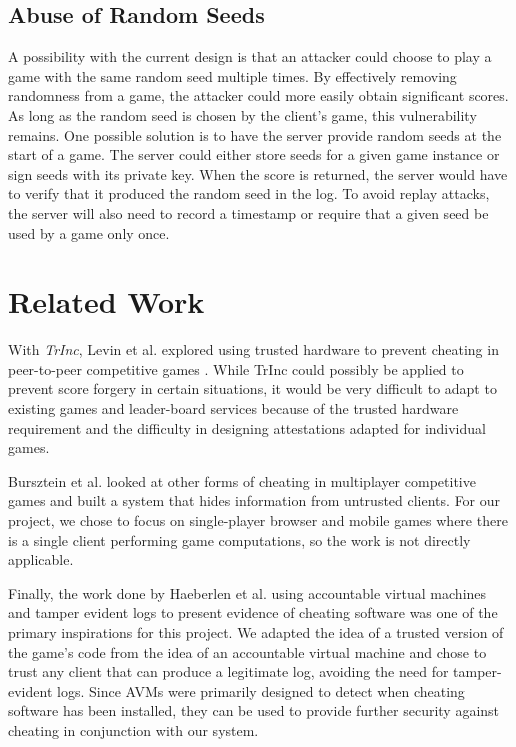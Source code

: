 \documentclass [11pt, twocolumn] {article}
\begin{document}
\subsection {Abuse of Random Seeds}

A possibility with the current design is that an attacker could choose to play a game with the same random seed multiple times. By effectively removing randomness from a game, the attacker could more easily obtain significant scores. As long as the random seed is chosen by the client's game, this vulnerability remains. One possible solution is to have the server provide random seeds at the start of a game. The server could either store seeds for a given game instance or sign seeds with its private key. When the score is returned, the server would have to verify that it produced the random seed in the log. To avoid replay attacks, the server will also need to record a timestamp or require that a given seed be used by a game only once. 

\section { Related Work } 

With \emph{TrInc}, Levin et al. explored using trusted hardware to prevent cheating in peer-to-peer competitive games \cite{trinc}. While TrInc could possibly be applied to prevent score forgery in certain situations, it would be very difficult to adapt to existing games and leader-board services because of the trusted hardware requirement and the difficulty in designing attestations adapted for individual games. 

Bursztein et al. \cite{bursztein}  looked at other forms of cheating in multiplayer competitive games and built a system that hides information from untrusted clients. For our project, we chose to focus on single-player browser and mobile games where there is a single client performing game computations, so the work is not directly applicable. 

Finally, the work done by Haeberlen et al. using accountable virtual machines and tamper evident logs to present evidence of cheating software\cite{haeberlen} was one of the primary inspirations for this project. We adapted the idea of a trusted version of the game's code from the idea of an accountable virtual machine and chose to trust any client that can produce a legitimate log, avoiding the need for tamper-evident logs. Since AVMs were primarily designed to detect when cheating software has been installed, they can be used to provide further security against cheating in conjunction with our system. 
\end{document}
